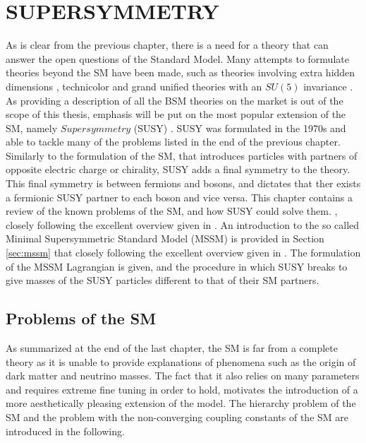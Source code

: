 \chapter{SUPERSYMMETRY} \label{susy}
\noindent\justify
As is clear from the previous chapter, there is a need for a theory that can answer the open questions of the Standard Model. 
Many attempts to formulate theories beyond the SM have been made, such as theories involving extra hidden dimensions \cite{ArkaniHamed:1998rs}, technicolor \cite{Hill:2002ap} and grand unified theories with an $SU(5)$ invariance \cite{Georgi:1974sy}.
As providing a description of all the BSM theories on the market is out of the scope of this thesis, emphasis will be put on the most popular extension of the SM, namely $Supersymmetry$ (SUSY) \cite{Wess:1973kz, Fayet:1974pd, Nilles:1983ge}. 
SUSY was formulated in the 1970s and able to tackle many of the problems listed in the end of the previous chapter. 
Similarly to the formulation of the SM, that introduces particles with partners of opposite electric charge or chirality, SUSY adds a final symmetry to the theory. 
This final symmetry is between fermions and bosons, and dictates that ther exists a fermionic SUSY partner to each boson and vice versa. 
\newpara
\noindent\justify
This chapter contains a review of the known problems of the SM, and how SUSY could solve them. , closely following the excellent overview given in \cite{Martin:1997ns}. 
An introduction to the so called Minimal Supersymmetric Standard Model (MSSM) is provided in Section \ref{sec:mssm} that closely following the excellent overview given in \cite{Martin:1997ns}.
The formulation of the MSSM Lagrangian is given, and the procedure in which SUSY breaks to give masses of the SUSY particles different to that of their SM partners. 
\newpage
\section{Problems of the SM}
\noindent\justify
As summarized at the end of the last chapter, the SM is far from a complete theory as it is unable to provide explanations of phenomena such as the origin of dark matter and neutrino masses. 
The fact that it also relies on many parameters and requires extreme fine tuning in order to hold, motivates the introduction of a more aesthetically pleasing extension of the model. 
The hierarchy problem of the SM and the problem with the non-converging coupling constants of the SM are introduced in the following. 
